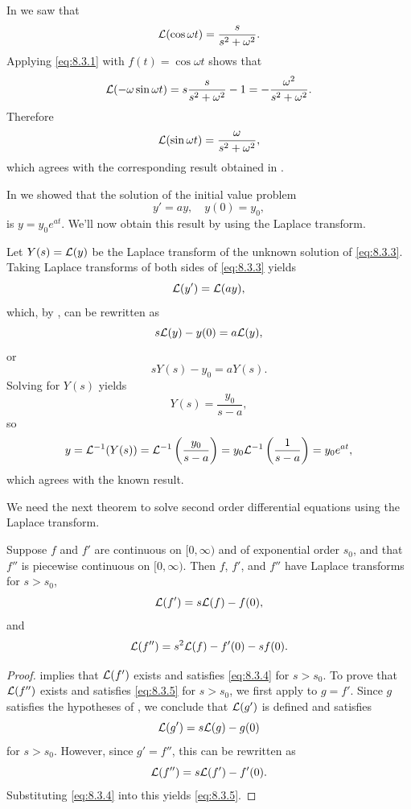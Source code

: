 \begin{example}\label{example:8.3.1}
In  we saw that
\[
{\mathcal L}(\cos\omega t)=\frac{s}{s^2+\omega^2}.
\]
Applying  \eqref{eq:8.3.1} with $f(t)=\cos\omega t$ shows that
\[
{\mathcal L}(-\omega\sin\omega t)=s \frac{s}{s^2+\omega^2}-1=-
\frac{\omega^2}{s^2+\omega^2}.
\]
Therefore
\[
{\mathcal L}(\sin\omega t)=\frac{\omega}{s^2+\omega^2},
\]
which agrees with the corresponding  result obtained  in
.
\end{example}

In  we showed that the solution of the
initial value problem
\begin{equation}\label{eq:8.3.3}
y'=ay, \quad  y(0)=y_0,
\end{equation}
 is $y=y_0e^{at}$.
We'll now obtain this result by using the Laplace transform.

Let $Y(s)={\mathcal L}(y)$ be the Laplace transform of the unknown solution
of \eqref{eq:8.3.3}. Taking Laplace transforms of both sides of
\eqref{eq:8.3.3} yields
\[
{\mathcal L}(y')={\mathcal L}(ay),
\]
which, by , can be rewritten as
\[
s{\mathcal L}(y)-y(0)=a{\mathcal L}(y),
\]
or
\[
sY(s)-y_0=aY(s).
\]
Solving for $Y(s)$ yields
\[
Y(s)=\frac{y_0}{s-a},
\]
so
\[
y={\mathcal L}^{-1}(Y(s))={\mathcal L}^{-1}\left(\frac{y_0}{s-a}\right)
=y_0{\mathcal L}^{-1}\left(\frac{1}{s-a}\right)=y_0e^{at},
\]
which agrees with the known result.

We  need the next theorem to solve second order differential equations
using  the Laplace transform.

\begin{theorem}\label{thmtype:8.3.2}
Suppose $f$ and $f'$ are continuous on $[0,\infty)$ and of
exponential order $s_0$, and that $f''$ is piecewise continuous on
$[0,\infty)$. Then $f$, $f'$, and $f''$ have Laplace transforms for $s
> s_0$,
\begin{equation}\label{eq:8.3.4}
{\mathcal L}(f')=s {\mathcal L}(f)-f(0),
\end{equation}
and
\begin{equation}\label{eq:8.3.5}
{\mathcal L}(f'')=s^2{\mathcal L}(f)-f'(0)-sf(0).
\end{equation}
\end{theorem}

\begin{proof}
 implies that ${\mathcal L}(f')$ exists and
satisfies \eqref{eq:8.3.4} for $s>s_0$. To prove that ${\mathcal L}(f'')$
exists and satisfies \eqref{eq:8.3.5} for $s>s_0$, we first apply
 to $g=f'$. Since $g$ satisfies the hypotheses
of , we conclude that ${\mathcal L}(g')$ is defined
and satisfies
\[
{\mathcal L}(g')=s{\mathcal L}(g)-g(0)
\]
for $s>s_0$. However, since $g'=f''$, this can be rewritten as
\[
{\mathcal L}(f'')=s{\mathcal L}(f')-f'(0).
\]
Substituting \eqref{eq:8.3.4} into this yields
\eqref{eq:8.3.5}.
\end{proof}


